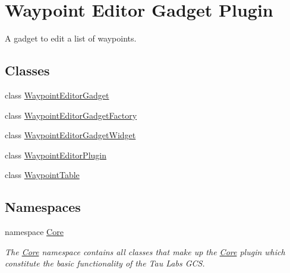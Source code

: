 \hypertarget{group___waypoint_editor_gadget_plugin}{\section{\-Waypoint \-Editor \-Gadget \-Plugin}
\label{group___waypoint_editor_gadget_plugin}
}


\-A gadget to edit a list of waypoints.  


\subsection*{\-Classes}
\begin{DoxyCompactItemize}
\item 
class \hyperlink{class_waypoint_editor_gadget}{\-Waypoint\-Editor\-Gadget}
\item 
class \hyperlink{class_waypoint_editor_gadget_factory}{\-Waypoint\-Editor\-Gadget\-Factory}
\item 
class \hyperlink{class_waypoint_editor_gadget_widget}{\-Waypoint\-Editor\-Gadget\-Widget}
\item 
class \hyperlink{class_waypoint_editor_plugin}{\-Waypoint\-Editor\-Plugin}
\item 
class \hyperlink{class_waypoint_table}{\-Waypoint\-Table}
\end{DoxyCompactItemize}
\subsection*{\-Namespaces}
\begin{DoxyCompactItemize}
\item 
namespace \hyperlink{namespace_core}{\-Core}
\begin{DoxyCompactList}\small\item\em \-The \hyperlink{namespace_core}{\-Core} namespace contains all classes that make up the \hyperlink{namespace_core}{\-Core} plugin which constitute the basic functionality of the \-Tau \-Labs \-G\-C\-S. \end{DoxyCompactList}\end{DoxyCompactItemize}

